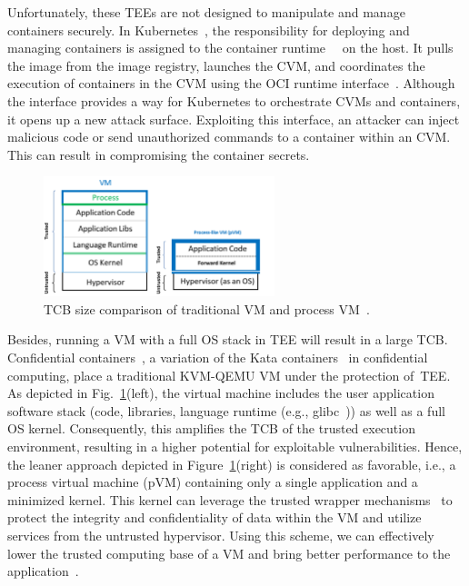 Unfortunately, these \acrshort{TEE}s are not designed to manipulate and manage containers securely. In Kubernetes~\cite*{k8s}, the responsibility for deploying and managing containers is assigned to the container runtime~\cite*{containerd}~\cite*{cri-o} on the host. It pulls the image from the image registry, launches the \acrshort{CVM}, and coordinates the 
execution of containers in the \acrshort{CVM} using the OCI runtime interface~\cite*{oci-runtime-spec}. Although the interface provides a way for Kubernetes to orchestrate \acrshort{CVM}s and containers, it opens up a new attack surface. Exploiting this interface, an attacker can inject malicious code or send unauthorized commands to 
a container within an \acrshort{CVM}. This can result in compromising the container secrets.
 
 
\begin{figure}[!htb]
  \centering
  \includegraphics[width=0.6\textwidth]{images/VM_vs_PVM.png}
  \caption[TCB size comparison of traditional VM and process VM]{TCB size comparison of traditional VM and process VM~\cite*{10.1145/3436512}.}
  \label{fig:VM_vs_PVM}
\end{figure}
 
Besides, running a VM with a full OS stack in \acrshort{TEE}  will result in a large \acrshort{TCB}. Confidential containers~\cite*{confidential_kata}, a variation of the Kata containers~\cite*{Kata-Containers} in confidential computing, place a traditional KVM-QEMU VM under the protection of~\acrshort{TEE}. As depicted in Fig.~\ref{fig:VM_vs_PVM}(left), the virtual machine includes the 
user application software stack (code, libraries, language runtime (e.g., glibc~\cite*{glibc})) as well as a full OS kernel. Consequently, this amplifies the \acrshort{TCB} of the trusted execution environment, resulting in a higher potential for exploitable vulnerabilities. Hence, the leaner approach depicted in Figure~\ref{fig:VM_vs_PVM}(right) is considered as favorable, i.e., a process virtual machine (\acrshort{pVM}) containing only a single application and a minimized kernel. This kernel can leverage the trusted wrapper mechanisms~\cite*{Hoekstra2013UsingII} to protect the integrity and confidentiality of data within the VM and utilize services 
from the untrusted hypervisor. Using this scheme, we can effectively lower the trusted computing base of a VM and bring better performance to the application~\cite*{quark_performance_report}.
 

